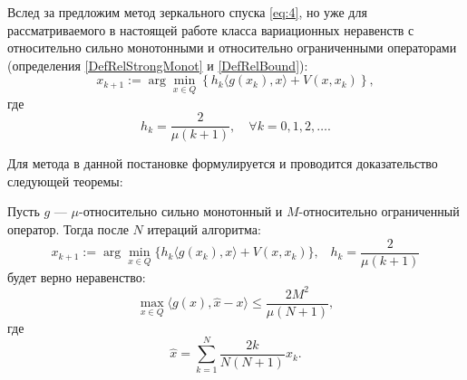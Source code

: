 Вслед за \cite{Simon_Julien_Bach_2012} предложим метод зеркального спуска \eqref{eq:4}, но уже для рассматриваемого в настоящей работе класса  вариационных неравенств с относительно сильно монотонными и относительно ограниченными операторами (определения \ref{DefRelStrongMonot} и \ref{DefRelBound}):
\begin{equation} \label{eq:4}
    x_{k+1} := \arg \min_{x \in Q} \left\{ h_k \langle g(x_k), x \rangle + V(x, x_k)\right\},
\end{equation}
где
$$
    h_k = \frac{2}{\mu(k+1)},\quad  \forall k= 0,1, 2, \ldots.
$$

Для метода в данной постановке формулируется и проводится доказательство следующей теоремы:
\begin{theorem}\label{thm_MD_VI}
    Пусть $g$ --- $\mu$-относительно сильно монотонный и $M$-относитель\-но ограниченный оператор. Тогда после $N$ итераций алгоритма: 
    $$ 
        x_{k+1} := \arg \min_{x \in Q} \{ h_k \langle g(x_k), x\rangle + V(x, x_k)\}, \;\;\; h_k = \frac{2}{\mu (k+1)}
    $$
    будет верно неравенство:
    \begin{equation}\label{eq:2}
        \max_{x \in Q} \langle g(x), \widehat{x} - x\rangle \leq \frac{2 M^2}{\mu (N+1)},
    \end{equation}
    где 
    $$
        \widehat{x} = \sum_{k=1}^{N} \frac{2 k}{N (N+1)} x_k.
    $$
\end{theorem}

